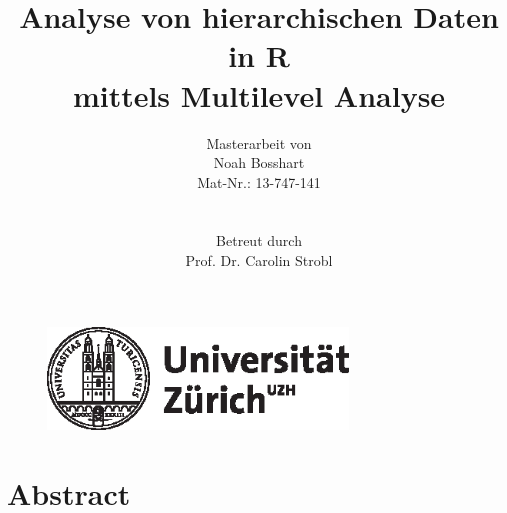 \documentclass[12pt]{article}\usepackage[]{graphicx}\usepackage[]{color}
\title{Analyse von hierarchischen Daten in R \\ mittels Multilevel Analyse}
\author{Masterarbeit von \\ Noah Bosshart \\ Mat-Nr.: 13-747-141 \\ \\ \\ Betreut durch \\ Prof. Dr. Carolin Strobl}
\numberwithin{equation}{section}
\begin{document}
\begin{figure}[t]
  \centering
  \includegraphics[width = 8cm]{uzh_logo}
\end{figure}

\maketitle
\thispagestyle{empty}

\newpage
{}
\tableofcontents

\newpage
\listoffigures

\newpage
\listoftables
\newpage


\section{Abstract}
\newpage

\end{document}
